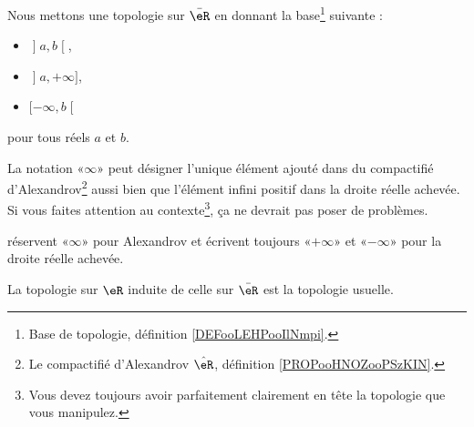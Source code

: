 \begin{definition}		\label{DEFooHZWOooXByzEp}
	Nous mettons une topologie sur \( \bar\eR\) en donnant la base\footnote{Base de topologie, définition \ref{DEFooLEHPooIlNmpi}.} suivante :
	\begin{itemize}
		\item \( \mathopen] a , b \mathclose[\),
		\item \( \mathopen] a , +\infty \mathclose]\),
		\item \( \mathopen[ -\infty , b \mathclose[\)
	\end{itemize}
	pour tous réels \( a\) et \( b\).
\end{definition}

\begin{normaltext}
	La notation «\( \infty\)» peut désigner l'unique élément ajouté dans du compactifié d'Alexandrov\footnote{Le compactifié d'Alexandrov \( \hat \eR\), définition \ref{PROPooHNOZooPSzKIN}.} aussi bien que l'élément infini positif dans la droite réelle achevée. Si vous faites attention au contexte\footnote{Vous devez toujours avoir parfaitement clairement en tête la topologie que vous manipulez.}, ça ne devrait pas poser de problèmes.

	 réservent «\( \infty\)» pour Alexandrov et écrivent toujours «\( +\infty\)» et «\( -\infty\)» pour la droite réelle achevée.
\end{normaltext}

\begin{lemma}
	La topologie sur \( \eR\) induite de celle sur \( \bar \eR\) est la topologie usuelle.
\end{lemma}

